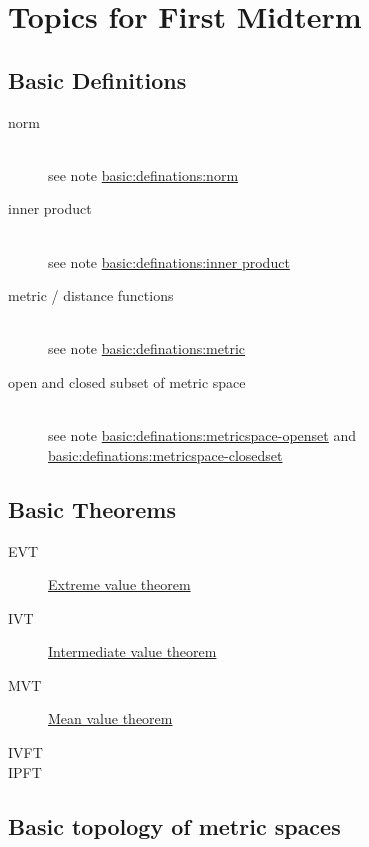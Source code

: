 \section{Topics for First Midterm}


\subsection{Basic Definitions}

\begin{description}
\item[norm]\hfill\\
	see note \hyperref[def:norm]{basic:definations:norm}
\item[inner product]\hfill\\
	see note \hyperref[def:innerprod]{basic:definations:inner product}
\item[metric / distance functions]\hfill\\
	see note \hyperref[def:metric]{basic:definations:metric}
\item[open and closed subset of metric space]\hfill\\
	see note \hyperref[def:metric]{basic:definations:metricspace-openset}
		and \hyperref[def:metric]{basic:definations:metricspace-closedset}
\end{description}

\subsection{Basic Theorems}
\begin{description}
\item[EVT] \hyperref[thm:evt]{Extreme value theorem}
\item[IVT] \hyperref[thm:ivt]{Intermediate value theorem}
\item[MVT] \hyperref[thm:mvt]{Mean value theorem}
\item[IVFT] 
\item[IPFT] 
\end{description}

\subsection{Basic topology of metric spaces}

